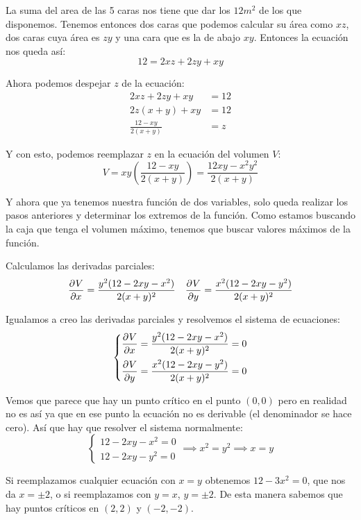 \documentclass[12pt]{article}
\begin{document}
La suma del area de las 5 caras nos tiene que dar los $ 12m^2 $ de los que disponemos. Tenemos entonces dos caras que podemos calcular su área como $ xz $, dos caras cuya área es $ zy $ y una cara que es la de abajo $ xy $. Entonces la ecuación nos queda así:
\[
  12 = 2xz + 2zy + xy
\]

Ahora podemos despejar $ z $ de la ecuación:
\begin{align*}
  2xz + 2zy + xy &= 12\\
  2z(x+y)+xy &= 12\\
  \frac{12-xy}{2(x+y)} &= z
\end{align*}

Y con esto, podemos reemplazar $ z $ en la ecuación del volumen $ V $:
\[
	V = xy\left(\frac{12-xy}{2(x+y)}\right) = \frac{12xy-x^2y^2}{2(x+y)}
\]

Y ahora que ya tenemos nuestra función de dos variables, solo queda realizar los pasos anteriores y determinar los extremos de la función. Como estamos buscando la caja que tenga el volumen máximo, tenemos que buscar valores máximos de la función.

Calculamos las derivadas parciales:
\begin{align*}
  \pdv[]{V}{x} = \frac{y^2(12-2xy-x^2)}{2(x+y)^2} && \pdv[]{V}{y} = \frac{x^2(12-2xy-y^2)}{2(x+y)^2}
\end{align*}

Igualamos a creo las derivadas parciales y resolvemos el sistema de ecuaciones:
\[
\left\{
\begin{aligned}
  \pdv[]{V}{x} = \frac{y^2(12-2xy-x^2)}{2(x+y)^2} = 0 \\
  \pdv[]{V}{y} = \frac{x^2(12-2xy-y^2)}{2(x+y)^2} = 0
\end{aligned}
\right.
\]  

Vemos que parece que hay un punto crítico en el punto $ (0,0) $ pero en realidad no es así ya que en ese punto la ecuación no es derivable (el denominador se hace cero). Así que hay que resolver el sistema normalmente:
\[
  \left\{
  \begin{aligned}
    12-2xy-x^2 = 0 \\
    12-2xy-y^2 = 0
  \end{aligned}
  \right.  \implies x^2 = y^2  \implies x = y
\]

Si reemplazamos cualquier ecuación con $ x = y $ obtenemos $ 12 - 3x^2 = 0 $, que nos da $ x = \pm 2 $, o si reemplazamos con $ y=x $, $ y=\pm 2 $. De esta manera sabemos que hay puntos críticos en $ (2,2) $ y $ (-2,-2) $.
\end{document}
